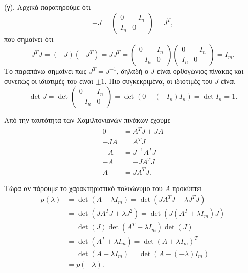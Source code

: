 \begin{solution}
    (γ). Αρχικά παρατηρούμε ότι
    \[
        -J = \begin{pmatrix}
            0 & -I_n \\
            I_n & 0
        \end{pmatrix} = J^T,
    \]
    που σημαίνει ότι
    \[
        J^{T}J = (-J) (-J^T) = JJ^T =
        \begin{pmatrix}
            0 & I_n \\
            -I_n & 0
        \end{pmatrix}
        \begin{pmatrix}
            0 & -I_n \\
            I_n & 0
        \end{pmatrix} = I_m.
    \]
    Το παραπάνω σημαίνει πως \( J^T = J^{-1} \), δηλαδή ο \( J \) είναι ορθογώνιος
    πίνακας και συνεπώς οι ιδιοτιμές του είναι \( \pm 1 \). Πιο συγκεκριμένα, οι
    ιδιοτιμές του \( J \) είναι
    \[
        \det{J} = \det{\begin{pmatrix}0 & I_n\\ -I_n & 0\end{pmatrix}} =
        \det{\left( 0 - (-I_n)I_n \right)} = \det{I_n} = 1.
    \]

    Από την ταυτότητα των Χαμιλτονιανών πινάκων έχουμε
    \begin{align*}
        0 &= A^{T}J + JA \\
        -JA &= A^{T}J \\
        -A &= J^{-1}A^{T}J \\
        -A &= -JA^{T}J \\
        A &= JA^{T}J.
    \end{align*}

    Τώρα αν πάρουμε το χαρακτηριστικό πολυώνυμο του \( A \) προκύπτει
    \begin{align*}
        p(\lambda) &= \det{\left( A - \lambda I_m \right)}
        = \det{\left( JA^{T}J - \lambda J^{T}J \right)} \\
        &= \det{\left( JA^{T}J + \lambda J^{2} \right)}
        = \det{\left( J\left(A^{T} + \lambda I_m\right)J \right)} \\
        &= \det{\left( J \right)}
        \det{\left( A^T + \lambda I_m \right)}
        \det{\left( J \right)}\\
        &= \det{\left( A^T + \lambda I_m \right)}
        = \det{\left( A + \lambda I_m \right)^{T}}\\
        &= \det{\left( A + \lambda I_m \right)}
        = \det{\left( A - (-\lambda) I_m \right)}\\
        &= p(-\lambda).
    \end{align*}


\end{solution}
